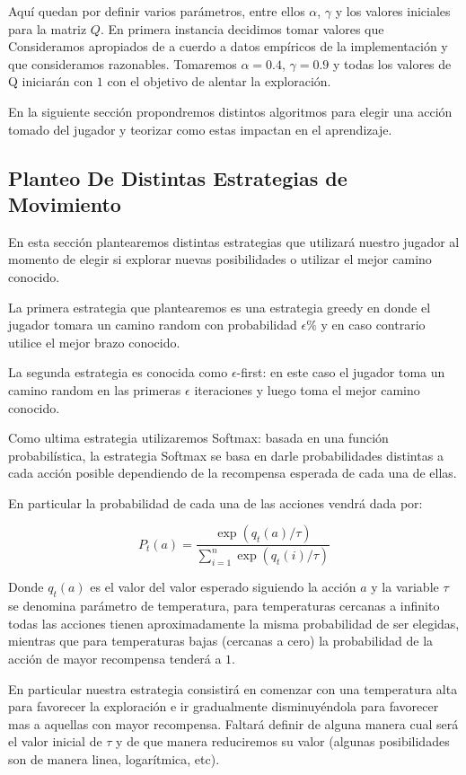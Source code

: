 Aquí quedan por definir varios parámetros, entre ellos $\alpha$, $\gamma$ y los valores iniciales para la matriz $Q$. En primera instancia decidimos tomar valores que Consideramos apropiados de a cuerdo a datos empíricos de la implementación y que consideramos razonables. Tomaremos $\alpha=0.4 $, $\gamma=0.9$ y todas los valores de Q iniciarán con $1$ con el objetivo de alentar la exploración.

En la siguiente sección propondremos distintos algoritmos para elegir una acción tomado del jugador y teorizar como estas impactan en el aprendizaje.

\subsection{Planteo De Distintas Estrategias de Movimiento}

En esta sección plantearemos distintas estrategias que utilizará nuestro jugador al momento de elegir si explorar nuevas posibilidades o utilizar el mejor camino conocido.

La primera estrategia que plantearemos es una estrategia greedy en donde el jugador tomara un camino random con probabilidad $\epsilon\%$ y en caso contrario utilice el mejor brazo conocido.

La segunda estrategia es conocida como $\epsilon$-first: en este caso el jugador toma un camino random en las primeras $\epsilon$ iteraciones y luego toma el mejor camino conocido.

Como ultima estrategia utilizaremos Softmax: basada en una función probabilística, la estrategia Softmax se basa en darle probabilidades distintas a cada acción posible dependiendo de la recompensa esperada de cada una de ellas.

En particular la probabilidad de cada una de las acciones vendrá dada por:

$$P_t(a) = \frac{\exp(q_t(a)/\tau)}{\sum_{i=1}^n\exp(q_t(i)/\tau)}$$

Donde $q_t(a)$ es el valor del valor esperado siguiendo la acción $a$ y la variable $\tau$ se denomina parámetro de temperatura, para temperaturas cercanas a infinito todas las acciones tienen aproximadamente la misma probabilidad de ser elegidas, mientras que para temperaturas bajas (cercanas a cero) la probabilidad de la acción de mayor recompensa tenderá a $1$.

En particular nuestra estrategia consistirá en comenzar con una temperatura alta para favorecer la exploración e ir gradualmente disminuyéndola para favorecer mas a aquellas con mayor recompensa. Faltará definir de alguna manera cual será el valor inicial de $\tau$ y de que manera reduciremos su valor (algunas posibilidades son de manera linea, logarítmica, etc).

